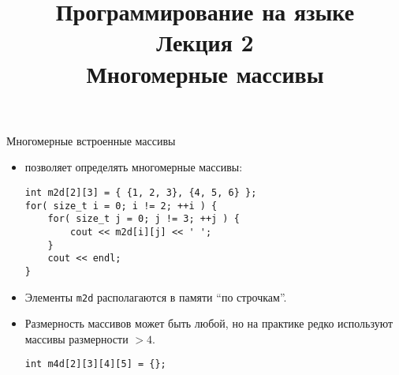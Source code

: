 \documentclass{beamer}
\title{{\bf Программирование на языке \langcpp\protect\\Лекция
2\protect\vspace{1em}\\}Многомерные массивы}
\begin{document}
\begin{frame} 
  \titlepage
\end{frame}


\begin{frame}[fragile]{Многомерные встроенные массивы}
    \begin{itemize}
        \item \langcpp позволяет определять многомерные массивы:
        \begin{lstlisting}
int m2d[2][3] = { {1, 2, 3}, {4, 5, 6} };
for( size_t i = 0; i != 2; ++i ) {
    for( size_t j = 0; j != 3; ++j ) {
        cout << m2d[i][j] << ' ';
    }
    cout << endl;
}
        \end{lstlisting}
    \item Элементы {\tt m2d} располагаются в памяти ``по строчкам''.

    \item Размерность массивов может быть любой, но на практике
        редко используют массивы размерности $> 4$.

\begin{lstlisting}
int m4d[2][3][4][5] = {};
\end{lstlisting}
    \end{itemize}
\end{frame}
\end{document}
